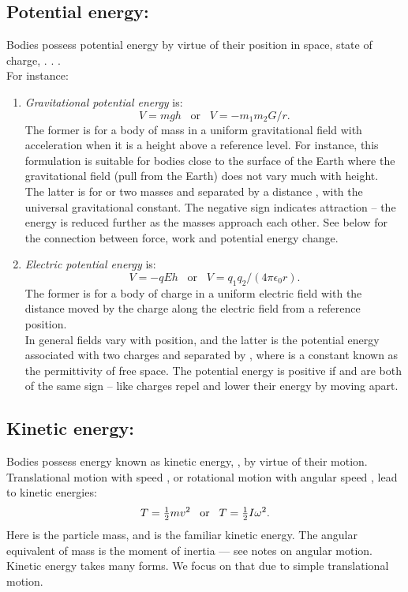 \subsection{Potential energy:}Bodies possess potential energy by virtue of their position in space, state of charge, . . .\\
For instance:
\begin{enumerate}
  \item \textit{Gravitational potential energy} is:
\begin{equation*} 
    V = m g h \;\;\; \textrm{or} \;\;\; V = - m_1m_2 G/r.
\end{equation*}
The former is for a body of mass  in a uniform gravitational field with acceleration  when it is a height  above a reference level.  For instance, this formulation is suitable for bodies close to the surface of the Earth where the gravitational field (pull from the Earth) does not vary much with height.\\
The latter is for or two masses  and  separated by a distance , with  the universal gravitational constant.  The negative sign indicates attraction -- the energy is reduced further as the masses approach each other.  See below for the connection between force, work and potential energy change.
  \item \textit{Electric potential energy} is:
   \begin{equation*} 
   V = - q E h \;\;\; \textrm{or} \;\;\; V = q_1q_2/(4\pi \epsilon_0 r).
\end{equation*} 
The former is for a body of charge  in a uniform electric field  with  the distance moved by the charge along the electric field from a reference position.\\
In general fields vary with position, and the latter is the potential energy associated with two charges  and  separated by , where  is a constant known as the permittivity of free space.  The potential energy is positive if  and  are both of the same sign -- like charges repel and lower their energy by moving apart.
\end{enumerate}
\subsection{Kinetic energy:}  Bodies possess energy known as kinetic energy, , by virtue of their motion.  Translational motion with speed , or rotational motion with angular speed \vari{\omega}, lead to kinetic energies:
 \begin{equation*} T = {\textstyle \frac{1}{2}} m v^2 \;\;\; \textrm{or} \;\;\; T = {\textstyle \frac{1}{2}} I \omega^2.
\end{equation*}
Here  is the particle mass, and  is the familiar kinetic energy.  The angular equivalent of mass is the moment of inertia   --- see notes on angular motion.  Kinetic energy takes many forms.  We focus on that due to simple translational motion.

